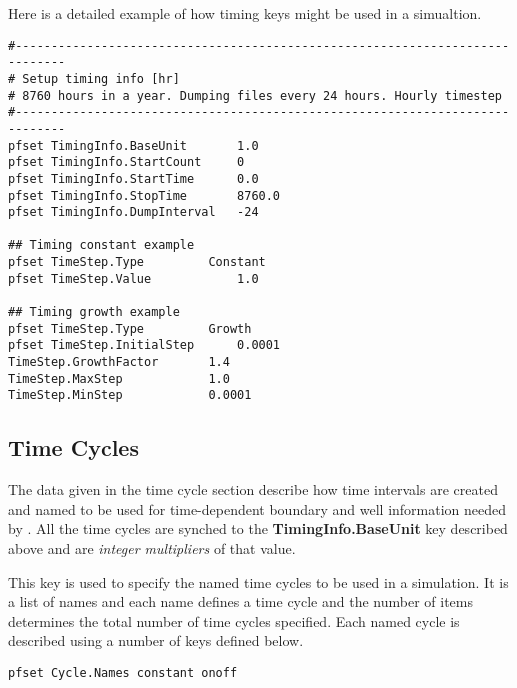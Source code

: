 Here is a detailed example of how timing keys might be used in a simualtion.
\begin{display}\begin{verbatim}
#-----------------------------------------------------------------------------
# Setup timing info [hr]
# 8760 hours in a year. Dumping files every 24 hours. Hourly timestep
#-----------------------------------------------------------------------------
pfset TimingInfo.BaseUnit		1.0
pfset TimingInfo.StartCount		0
pfset TimingInfo.StartTime		0.0
pfset TimingInfo.StopTime		8760.0
pfset TimingInfo.DumpInterval	-24

## Timing constant example
pfset TimeStep.Type			Constant
pfset TimeStep.Value			1.0

## Timing growth example
pfset TimeStep.Type			Growth
pfset TimeStep.InitialStep		0.0001
TimeStep.GrowthFactor		1.4
TimeStep.MaxStep			1.0
TimeStep.MinStep			0.0001
\end{verbatim}\end{display}



\subsection{Time Cycles}
\label{Time Cycles}

The data given in the time cycle section describe how time intervals are created and named to be used for time-dependent boundary and well information needed by \parflow{}.  All the time cycles are synched to the {\bf TimingInfo.BaseUnit} key described above and are {\em integer multipliers} of that value.

{
This key is used to specify the named time cycles to be used in a simulation.  It is a list of names and each name defines a time cycle and the number of items determines the total number of time cycles specified.  Each named cycle is described using a number of keys defined below.
}
\begin{display}\begin{verbatim}
pfset Cycle.Names constant onoff
\end{verbatim}\end{display}

